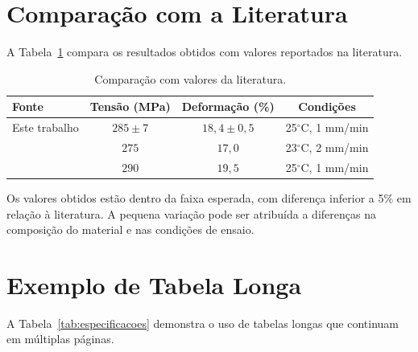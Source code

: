 \section{Comparação com a Literatura}

A Tabela~\ref{tab:comparacao} compara os resultados obtidos com valores reportados na literatura.

\begin{table}[H]
\centering
\caption{Comparação com valores da literatura.}
\label{tab:comparacao}
\begin{tabular}{lccc}
\toprule
Fonte & Tensão (MPa) & Deformação (\%) & Condições \\
\midrule
Este trabalho & $285 \pm 7$ & $18,4 \pm 0,5$ & 25$^\circ$C, 1 mm/min \\
\textcite{Degarmo2003} & $275$ & $17,0$ & 23$^\circ$C, 2 mm/min \\
\textcite{Howard1971} & $290$ & $19,5$ & 25$^\circ$C, 1 mm/min \\
\bottomrule
\end{tabular}
\end{table}

Os valores obtidos estão dentro da faixa esperada, com diferença inferior a 5\% em relação à literatura. A pequena variação pode ser atribuída a diferenças na composição do material e nas condições de ensaio.

\section{Exemplo de Tabela Longa}

A Tabela~\ref{tab:especificacoes} demonstra o uso de tabelas longas que continuam em múltiplas páginas.

